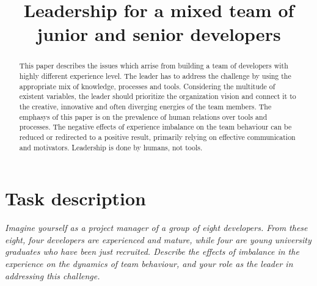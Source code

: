 \documentclass[conference]{IEEEtran}
\begin{document}
%
\title{Leadership for a mixed team  of \newline junior and senior developers}


\author{
}

\maketitle

\begin{abstract}
This paper describes the issues which arrise from building a team of developers
with highly different experience level. The leader has to address the challenge by using the appropriate 
mix of knowledge, processes and tools. 
\newline
Considering the multitude of existent variables, the leader should prioritize the organization vision and connect it to the creative, innovative and often diverging energies of the team members. The emphasys of this paper is on the prevalence of human relations over tools and processes. The negative effects of experience imbalance on the team behaviour can be reduced or redirected to a positive result, primarily relying on effective communication and motivators. Leadership is done by humans, not tools.
\end{abstract}

\IEEEpeerreviewmaketitle

\section{Task description}
\textit{Imagine yourself as a project manager of a group of eight developers.
From these eight, four developers are experienced and mature, while four are young university graduates who have been just recruited. 
\newline\indent 
Describe the effects of imbalance in the experience on the dynamics of team behaviour, and your role as the leader in addressing this challenge.}
\end{document}
